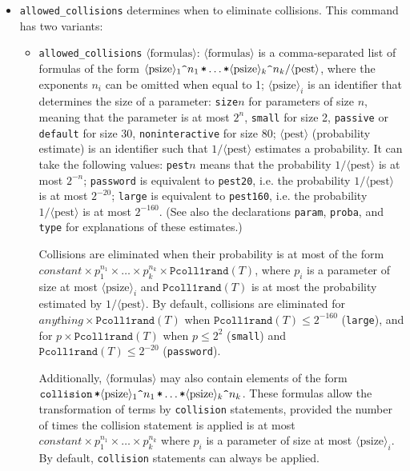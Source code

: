 \documentclass{article}
\newcommand{\tttimes}{\mathop{\texttt{*}}}
\newcommand{\nonterm}[1]{\langle\textrm{#1}\rangle}
\begin{document}
\begin{itemize}
\item \texttt{allowed\string_collisions} determines when to eliminate collisions. This command has two variants:
\begin{itemize}
\item \texttt{allowed\string_collisions} $\nonterm{formulas}$: 
$\nonterm{formulas}$ is 
a comma-separated list of formulas of the form
$\nonterm{psize}_1\texttt{\string^}{n_1} \tttimes \dots \tttimes \nonterm{psize}_k\texttt{\string^}{n_k} / \nonterm{pest}$,
where the exponents $n_i$ can be omitted when equal to 1;
$\nonterm{psize}_i$ is an identifier that determines the size of a
parameter: \texttt{size$n$} for parameters of size $n$, meaning that the parameter is at most $2^n$,
\texttt{small} for size 2, \texttt{passive} or \texttt{default} for size 30,
\texttt{noninteractive} for size 80;
$\nonterm{pest}$ ({\sc p}robability {\sc est}imate) is an identifier 
such that $1/\nonterm{pest}$ estimates a probability. It can take the following values:
\texttt{pest$n$} means that the probability $1/\nonterm{pest}$ is at most $2^{-n}$;
\texttt{password} is equivalent to \texttt{pest20}, i.e. the probability $1/\nonterm{pest}$ is at most $2^{-20}$;
\texttt{large} is equivalent to \texttt{pest160}, i.e. the probability $1/\nonterm{pest}$ is at most $2^{-160}$. (See also the declarations \texttt{param}, \texttt{proba},
and \texttt{type} for explanations of these estimates.)

Collisions are eliminated when their probability 
is at most of the form  $\textit{constant} \times p_1^{n_1} \times \dots \times p_k^{n_k} \times \texttt{Pcoll1rand}(T)$,
where $p_i$ is a parameter of size at most $\nonterm{psize}_i$
and $\texttt{Pcoll1rand}(T)$ is at most the probability estimated by $1/\nonterm{pest}$.
By default, collisions are eliminated for $\textit{anything} \times \texttt{Pcoll1rand}(T)$ when $\texttt{Pcoll1rand}(T) \leq 2^{-160}$ (\texttt{large}),
and for $p \times \texttt{Pcoll1rand}(T)$ when $p \leq 2^2$ (\texttt{small}) and $\texttt{Pcoll1rand}(T) \leq 2^{-20}$ (\texttt{password}).

Additionally, $\nonterm{formulas}$ may also contain elements of the form
$ \texttt{collision} \tttimes \nonterm{psize}_1\texttt{\string^}{n_1} \tttimes \dots \tttimes \allowbreak \nonterm{psize}_k\texttt{\string^}{n_k}$.
These formulas allow the transformation of terms by \texttt{collision} statements, provided 
the number of times the collision statement is applied is at most 
$\textit{constant} \times p_1^{n_1} \times \dots \times p_k^{n_k}$
where $p_i$ is a parameter of size at most $\nonterm{psize}_i$.
By default, \texttt{collision} statements can always be applied.


\end{itemize}
\end{itemize}
\end{document}
